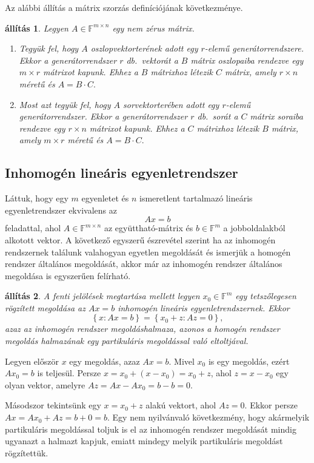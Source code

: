 \documentclass[9pt, a4paper, showtrims]{memoir}
\makeatletter
\renewenvironment{proof}[1][\proofname]
    {\par\pushQED{\qed}%
    \normalfont \topsep6\p@\@plus6\p@\relax
    \trivlist
    \item[\hskip\labelsep
        \itshape
    #1\@addpunct{:}]\ignorespaces}
    {\popQED\endtrivlist\@endpefalse}
\theoremstyle{plain}
\newtheorem{proposition}{állítás}[chapter]
\theoremstyle{remark}
\theoremstyle{definition}
\makeatother
\begin{document}
Az alábbi állítás a mátrix szorzás definíciójának következménye.
\begin{proposition}
	Legyen $A\in\mathbb{F}^{m\times n}$ egy nem zérus mátrix.
	\begin{enumerate}
		\item
		      Tegyük fel, hogy $A$ oszlopvektorterének adott egy $r$-elemű generátorrendszere.
		      Ekkor a generátorrendszer $r$ db.~vektorát a $B$ mátrix oszlopaiba rendezve egy $m\times r$ mátrixot kapunk.
		      Ehhez a $B$ mátrixhoz létezik $C$ mátrix, amely $r\times n$ méretű és
		      \(
		      A=B\cdot C.
		      \)
		\item
		      Most azt tegyük fel, hogy $A$ sorvektorterében adott egy $r$-elemű generátorrendszer.
		      Ekkor a generátorrendszer $r$ db.~sorát a $C$ mátrix soraiba rendezve egy $r\times n$ mátrixot kapunk.
		      Ehhez a $C$ mátrixhoz létezik $B$ mátrix, amely $m\times r$ méretű és
		      \(
		      A=B\cdot C.
		      \)
              \qedhere
	\end{enumerate}
\end{proposition}

\subsection{Inhomogén lineáris egyenletrendszer}
Láttuk, hogy egy $m$ egyenletet és $n$ ismeretlent tartalmazó lineáris egyenletrendszer ekvivalens az
\[
	Ax=b
\]
feladattal, ahol $A\in\mathbb{F}^{m\times n}$ az együttható-mátrix és $b\in\mathbb{F}^m$
a jobboldalakból alkotott vektor.
A következő egyszerű észrevétel szerint ha az inhomogén rendszernek találunk valahogyan egyetlen megoldását és ismerjük a homogén rendszer általános megoldását,
akkor már az inhomogén rendszer általános megoldása is egyszerűen felírható.
\begin{proposition}
	A fenti jelölések megtartása mellett
	legyen $x_0\in\mathbb{F}^m$ egy tetszőlegesen rögzített megoldása az $Ax=b$ inhomogén lineáris egyenletrendszernek.
	Ekkor
	\[
		\left\{ x:Ax=b \right\}
		=
		\left\{ x_0+z:Az=0 \right\},
	\]
	azaz az inhomogén rendszer megoldáshalmaza,
	azonos a homogén rendszer megoldás halmazának egy partikuláris megoldással való
	eltoltjával.
\end{proposition}
\begin{proof}
	Legyen először $x$ egy megoldás, azaz $Ax=b$.
	Mivel $x_0$ is egy megoldás, ezért $Ax_{0}=b$ is teljesül.
	Persze $x=x_0+\left( x-x_0 \right)=x_0+z$, ahol $z=x-x_0$ egy olyan vektor,
	amelyre $Az=Ax-Ax_0=b-b=0$.

	Másodszor tekintsünk egy $x=x_0+z$ alakú vektort, ahol $Az=0$.
	Ekkor persze $Ax=Ax_0+Az=b+0=b$.
\end{proof}
Egy nem nyilvánvaló következmény,
hogy akármelyik partikuláris megoldással toljuk is el az
inhomogén rendszer megoldását mindig ugyanazt a halmazt kapjuk,
emiatt mindegy melyik partikuláris megoldást rögzítettük.
\end{document}
